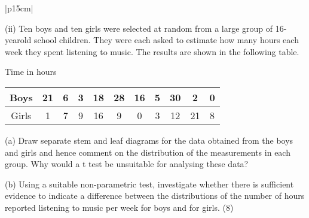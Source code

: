 \documentclass[a4paper,12pt]{article}
\begin{document}
 
\begin{table}[ht!]
 
\centering
 
\begin{tabular}{|p{15cm}|}
 
\hline  

 (ii) Ten boys and ten girls were selected at random from a large group of 16-yearold school children.  They were each asked to estimate how many hours each week they spent listening to music.  The results are shown in the following table. 
 
 Time in hours 
\begin{center}
\begin{tabular}{|c|cccccccccc|}
Boys & 21 & 6 & 3 & 18 & 28 & 16 & 5 & 30 &   2 & 0 \\ \hline 
Girls &   1 &  7 & 9 & 16 &   9 &   0 &  3 & 12&  21&  8\\  \hline 
\end{tabular}
\end{center} 
 
 (a) Draw separate stem and leaf diagrams for the data obtained from the boys and girls and hence comment on the distribution of the measurements in each group.  
Why would a t test be unsuitable for analysing these data?  
 
 
  (b) Using a suitable non-parametric test, investigate whether there is sufficient evidence to indicate a difference between the 
distributions of the number of hours reported listening to music per week for boys and for girls. (8) 
 

\\ \hline
  
\end{tabular}

\end{table} 
\end{document}
